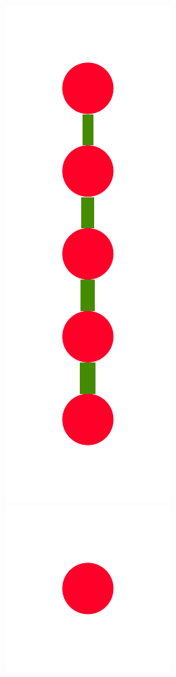 \documentclass[a4paper,10pt]{article}
\begin{document}
\begin{figure}
{    \includegraphics[scale=.14]{../figures/vector/6-3-recursion-data-5.pdf}
    \includegraphics[scale=.14]{../figures/vector/6-3-recursion-data-6.pdf}
}
\end{figure}
\end{document}
